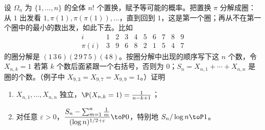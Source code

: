 \begin{workedexample}[随机置换的圈数]\label{we:weak-laws:cycles}
设 $\Omega_n$ 为 $\{1,\dots,n\}$ 的全体 $n!$ 个置换，赋予等可能的概率。把置换 $\pi$ 分解成圈：从 $1$ 出发看 $1,\pi(1),\pi(\pi(1)),\dots$，直到回到 $1$，这是第一个圈；再从不在第一个圈中的最小的数出发，如此下去。比如
\[
\begin{array}{c|ccccccccc}i&1&2&3&4&5&6&7&8&9\\\hline\pi(i)&3&9&6&8&2&1&5&4&7\end{array}
\]
的圈分解是 $(1\,3\,6)(2\,9\,7\,5)(4\,8)$。按圈分解中出现的顺序写下这 $n$ 个数，令 $X_{n,k}=1$ 若第 $k$ 个数后面紧跟一个右括号，否则为 $0$；$S_n=X_{n,1}+\cdots+X_{n,n}$ 是圈的个数。（例子中 $X_{9,3}=X_{9,7}=X_{9,9}=1$。）证明
\begin{enumerate}
\item $X_{n,1},\dots,X_{n,n}$ 独立，$\P(X_{n,k}=1)=\frac1{n-k+1}$；
\item 对任意 $\varepsilon>0$，$\dfrac{S_n-\sum_{m=1}^n\frac1m}{(\log n)^{1/2+\varepsilon}}\toP0$，特别地 $S_n/\log n\toP1$。
\end{enumerate}
\end{workedexample}
